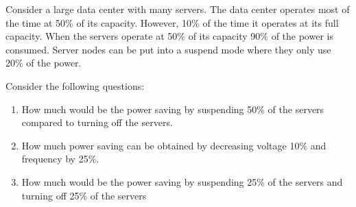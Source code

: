 \begin{acexercise}\end{acexercise}

Consider a large data center with many servers. The data center operates most of 
the time at 50\% of its capacity. However, 10\% of the time it operates at its
full capacity. When the servers operate at 50\% of its capacity 90\% of the power
is consumed. Server nodes can be put into a suspend mode where they only use
20\% of the power.

Consider the following questions:

\begin{enumerate}

\item How much would be the power saving by suspending 50\% of the servers
compared to turning off the servers.

\item How much power saving can be obtained by decreasing voltage 10\% and 
frequency by 25\%.

\item How much would be the power saving by suspending 25\% of the servers
and turning off 25\% of the servers

\end{enumerate}

\begin{acsolution}\end{acsolution}

